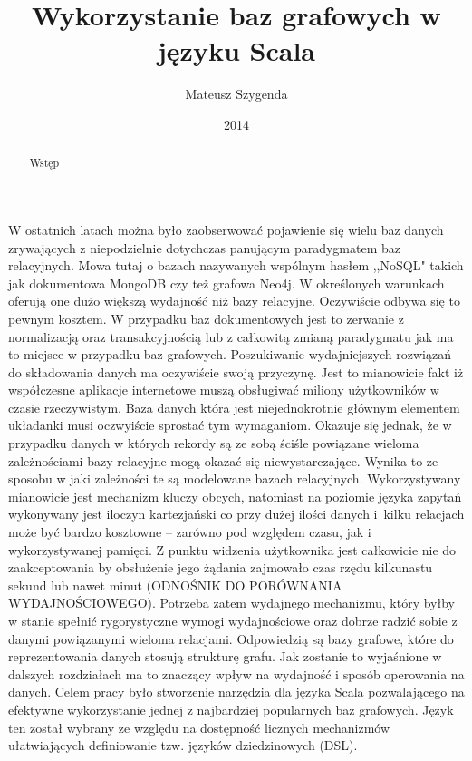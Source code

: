 \documentclass[brudnopis]{xmgr}
\author   {Mateusz Szygenda}
\title    {Wykorzystanie baz grafowych w języku Scala}
\date     {2014}
\begin{document}
\begin{abstract}
Wstęp
\end{abstract}

\maketitle

%
\introduction

W ostatnich latach można było zaobserwować pojawienie się wielu baz danych zrywających z niepodzielnie dotychczas panującym paradygmatem baz relacyjnych. Mowa tutaj o bazach nazywanych wspólnym hasłem ,,NoSQL" takich jak dokumentowa MongoDB czy też grafowa Neo4j. W określonych warunkach oferują one dużo większą wydajność niż bazy relacyjne. Oczywiście odbywa się to pewnym kosztem. W przypadku baz dokumentowych jest to zerwanie z normalizacją oraz transakcyjnością lub z całkowitą zmianą paradygmatu jak ma to miejsce w przypadku baz grafowych. Poszukiwanie wydajniejszych rozwiązań do składowania danych ma oczywiście swoją przyczynę. Jest to mianowicie fakt iż współczesne aplikacje internetowe muszą obsługiwać miliony użytkowników w czasie rzeczywistym. Baza danych która jest niejednokrotnie głównym elementem układanki musi oczwyiście sprostać tym wymaganiom. Okazuje się jednak, że w przypadku danych w których rekordy są ze sobą ściśle powiązane wieloma zależnościami bazy relacyjne mogą okazać się niewystarczające. Wynika to ze sposobu w jaki zależności te są modelowane bazach relacyjnych. Wykorzystywany mianowicie jest mechanizm kluczy obcych, natomiast na poziomie języka zapytań wykonywany jest iloczyn kartezjański co przy dużej ilości danych i~kilku relacjach może być bardzo kosztowne -- zarówno pod względem czasu, jak i wykorzystywanej pamięci. Z punktu widzenia użytkownika jest całkowicie nie do zaakceptowania by obsłużenie jego żądania zajmowało czas rzędu kilkunastu sekund lub nawet minut (ODNOŚNIK DO PORÓWNANIA WYDAJNOŚCIOWEGO). Potrzeba zatem wydajnego mechanizmu, który byłby w stanie spełnić rygorystyczne wymogi wydajnościowe oraz dobrze radzić sobie z danymi powiązanymi wieloma relacjami. Odpowiedzią są bazy grafowe, które do reprezentowania danych stosują strukturę grafu. Jak zostanie to wyjaśnione  w dalszych rozdziałach ma to znaczący wpływ na wydajność i sposób operowania na danych. Celem pracy było stworzenie narzędzia dla języka Scala pozwalającego na efektywne wykorzystanie jednej z najbardziej popularnych baz grafowych. Język ten został wybrany ze względu na dostępność licznych mechanizmów ułatwiających definiowanie tzw. języków dziedzinowych (DSL).
\end{document}
